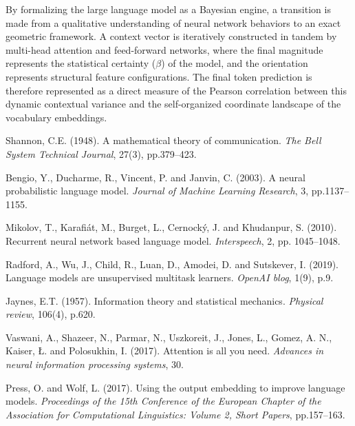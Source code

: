 \documentclass[11pt,a4paper]{article}
\begin{document}
	By formalizing the large language model as a Bayesian engine, a transition is made from a qualitative understanding of neural network behaviors to an exact geometric framework. A context vector is iteratively constructed in tandem by multi-head attention and feed-forward networks, where the final magnitude represents the statistical certainty ($\beta$) of the model, and the orientation represents structural feature configurations. The final token prediction is therefore represented as a direct measure of the Pearson correlation between this dynamic contextual variance and the self-organized coordinate landscape of the vocabulary embeddings.
	
	
	\begin{thebibliography}{}
		
		Shannon, C.E. (1948).
		A mathematical theory of communication.
		\textit{The Bell System Technical Journal}, 27(3), pp.379--423.
		
		Bengio, Y., Ducharme, R., Vincent, P. and Janvin, C. (2003).
		A neural probabilistic language model.
		\textit{Journal of Machine Learning Research}, 3, pp.1137--1155.
		
		Mikolov, T., Karafi{\'a}t, M., Burget, L., Cernock{\'y}, J. and Khudanpur, S. (2010).
		Recurrent neural network based language model.
		\textit{Interspeech}, 2, pp. 1045--1048.
		
		Radford, A., Wu, J., Child, R., Luan, D., Amodei, D. and Sutskever, I. (2019).
		Language models are unsupervised multitask learners.
		\textit{OpenAI blog}, 1(9), p.9.
		
		Jaynes, E.T. (1957).
		Information theory and statistical mechanics.
		\textit{Physical review}, 106(4), p.620.
		
		Vaswani, A., Shazeer, N., Parmar, N., Uszkoreit, J., Jones, L., Gomez, A. N., Kaiser, \L{}. and Polosukhin, I. (2017).
		Attention is all you need.
		\textit{Advances in neural information processing systems}, 30.
		
		Press, O. and Wolf, L. (2017).
		Using the output embedding to improve language models.
		\textit{Proceedings of the 15th Conference of the European Chapter of the Association for Computational Linguistics: Volume 2, Short Papers}, pp.157--163.
		

\end{thebibliography}
\end{document}
